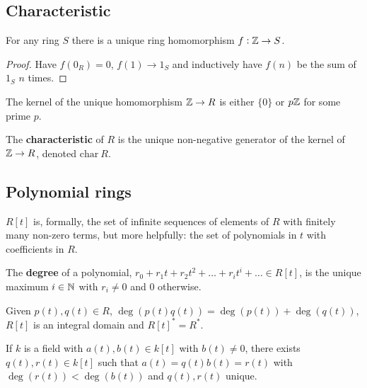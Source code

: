 \documentclass[../Year2.tex]{subfiles}
\begin{document}
\subsection{Characteristic}

\begin{lemma}
    For any ring $S$ there is a unique ring homomorphism $f:\mathbb{Z}\rightarrow S$.
    \begin{proof}
        Have $f(0_R)=0$, $f(1)\rightarrow 1_S$ and inductively have $f(n)$ be the sum of $1_S$ $n$ times.
    \end{proof}
\end{lemma}

\begin{lemma}
    The kernel of the unique homomorphism $\mathbb{Z}\rightarrow R$ is either $\{0\}$ or $p\mathbb{Z}$ for some prime $p$.
\end{lemma}

\begin{definition}[Characteristic]
    The \textbf{characteristic} of $R$ is the unique non-negative generator of the kernel of $\mathbb{Z}\rightarrow R$, denoted $\text{char}\ R$.
\end{definition}

\subsection{Polynomial rings}

\begin{definition}
    $R[t]$ is, formally, the set of infinite sequences of elements of $R$ with finitely many non-zero terms, but more helpfully: the set of polynomials in $t$ with coefficients in $R$.
\end{definition}

\begin{definition}
    The \textbf{degree} of a polynomial, $r_0 + r_1t + r_2t^2 + \ldots + r_i t^i + \ldots \in R[t]$, is the unique maximum $i\in\mathbb{N}$ with $r_i\neq 0$ and $0$ otherwise.
\end{definition}

\begin{lemma}
    Given $p(t),q(t)\in R$, $\deg(p(t)q(t))=\deg(p(t))+\deg(q(t))$, $R[t]$ is an integral domain and $R[t]^* = R^*$.
\end{lemma}

\begin{theorem}
    If $k$ is a field with $a(t),b(t)\in k[t]$ with $b(t)\neq 0$, there exists $q(t),r(t)\in k[t]$ such that $a(t)=q(t)b(t)=r(t)$ with $\deg(r(t))<\deg(b(t))$ and $q(t),r(t)$ unique.
\end{theorem}
\end{document}
